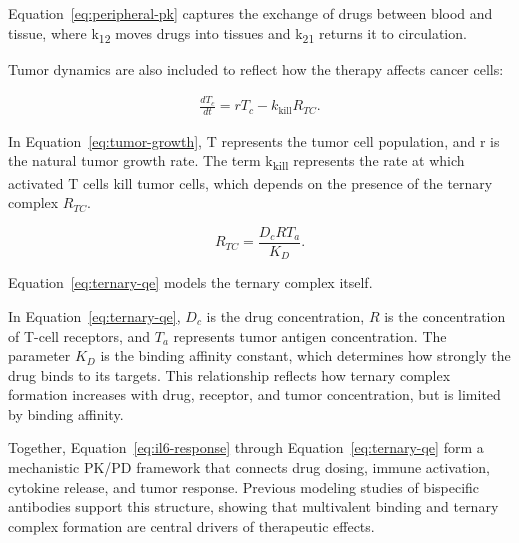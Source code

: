 \documentclass[11pt]{article}
\begin{document}
Equation~\ref{eq:peripheral-pk} captures the exchange of drugs between blood and tissue, where k\textsubscript{12  }moves drugs into tissues and k\textsubscript{21} returns it to circulation.
\par\medskip

Tumor dynamics are also included to reflect how the therapy affects cancer cells:
\par\medskip

\begin{equation}
\begin{aligned}
\frac{dT_c}{dt}=rT_c-k_{\mathrm{kill}}R_{TC}.
\end{aligned}
\label{eq:tumor-growth}
\end{equation}

In Equation~\ref{eq:tumor-growth}, T represents the tumor cell population, and r is the natural tumor growth rate. The term k\textsubscript{kill} represents the rate at which activated T cells kill tumor cells, which depends on the presence of the ternary complex $R_{TC}$.
\par\medskip

\begin{equation}
R_{TC}=\frac{D_c R T_a}{K_D}.
\label{eq:ternary-qe}
\end{equation}
\par\medskip

Equation~\ref{eq:ternary-qe} models the ternary complex itself.
\par\medskip

In Equation~\ref{eq:ternary-qe}, $D_c$ is the drug concentration, $R$ is the concentration of T-cell receptors, and $T_a$ represents tumor antigen concentration. The parameter $K_D$ is the binding affinity constant, which determines how strongly the drug binds to its targets. This relationship reflects how ternary complex formation increases with drug, receptor, and tumor concentration, but is limited by binding affinity.
\par\medskip

Together, Equation~\ref{eq:il6-response} through Equation~\ref{eq:ternary-qe} form a mechanistic PK/PD framework that connects drug dosing, immune activation, cytokine release, and tumor response. Previous modeling studies of bispecific antibodies support this structure, showing that multivalent binding and ternary complex formation are central drivers of therapeutic effects.
\par\medskip
\end{document}
